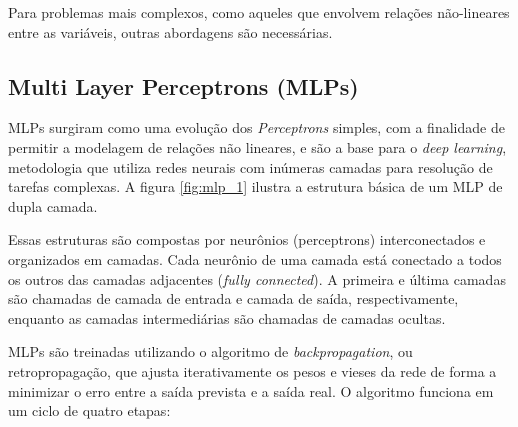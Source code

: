 Para problemas mais complexos, como aqueles que envolvem relações não-lineares entre as variáveis, outras abordagens
são necessárias.


\subsection{Multi Layer Perceptrons (MLPs)}
MLPs surgiram como uma evolução dos \textit{Perceptrons} simples, com a finalidade de permitir a modelagem de relações
não lineares, e são a base para o \textit{deep learning}, metodologia que utiliza redes neurais com inúmeras camadas para
resolução de tarefas complexas. A figura \ref{fig:mlp_1} ilustra a estrutura básica de um MLP de dupla camada.

\begin{figure}[!ht]
	{}
	{}
\end{figure}

Essas estruturas são compostas por neurônios (perceptrons) interconectados e organizados em camadas. Cada neurônio de uma 
camada está conectado a todos os outros das camadas adjacentes (\textit{fully connected}). A primeira e última camadas são 
chamadas de camada de entrada e camada de saída, respectivamente, enquanto as camadas intermediárias são chamadas de 
camadas ocultas.

MLPs são treinadas utilizando o algoritmo de \textit{backpropagation}, ou retropropagação, que ajusta iterativamente os 
pesos e vieses da rede de forma a minimizar o erro entre a saída prevista e a saída real. O algoritmo funciona em um ciclo 
de quatro etapas:

